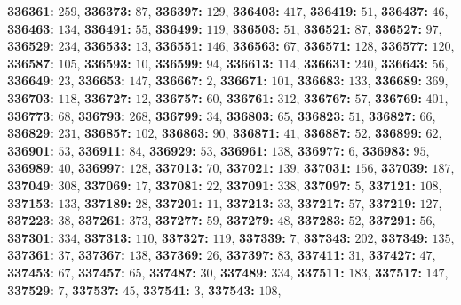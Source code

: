 \textsf{\bfseries 336361:} $259$, \textsf{\bfseries 336373:} $87$, \textsf{\bfseries 336397:} $129$, \textsf{\bfseries 336403:} $417$, \textsf{\bfseries 336419:} $51$, \textsf{\bfseries 336437:} $46$, \textsf{\bfseries 336463:} $134$, \textsf{\bfseries 336491:} $55$, \textsf{\bfseries 336499:} $119$, \textsf{\bfseries 336503:} $51$, \textsf{\bfseries 336521:} $87$, \textsf{\bfseries 336527:} $97$, \textsf{\bfseries 336529:} $234$, \textsf{\bfseries 336533:} $13$, \textsf{\bfseries 336551:} $146$, \textsf{\bfseries 336563:} $67$, \textsf{\bfseries 336571:} $128$, \textsf{\bfseries 336577:} $120$, \textsf{\bfseries 336587:} $105$, \textsf{\bfseries 336593:} $10$, \textsf{\bfseries 336599:} $94$, \textsf{\bfseries 336613:} $114$, \textsf{\bfseries 336631:} $240$, \textsf{\bfseries 336643:} $56$, \textsf{\bfseries 336649:} $23$, \textsf{\bfseries 336653:} $147$, \textsf{\bfseries 336667:} $2$, \textsf{\bfseries 336671:} $101$, \textsf{\bfseries 336683:} $133$, \textsf{\bfseries 336689:} $369$, \textsf{\bfseries 336703:} $118$, \textsf{\bfseries 336727:} $12$, \textsf{\bfseries 336757:} $60$, \textsf{\bfseries 336761:} $312$, \textsf{\bfseries 336767:} $57$, \textsf{\bfseries 336769:} $401$, \textsf{\bfseries 336773:} $68$, \textsf{\bfseries 336793:} $268$, \textsf{\bfseries 336799:} $34$, \textsf{\bfseries 336803:} $65$, \textsf{\bfseries 336823:} $51$, \textsf{\bfseries 336827:} $66$, \textsf{\bfseries 336829:} $231$, \textsf{\bfseries 336857:} $102$, \textsf{\bfseries 336863:} $90$, \textsf{\bfseries 336871:} $41$, \textsf{\bfseries 336887:} $52$, \textsf{\bfseries 336899:} $62$, \textsf{\bfseries 336901:} $53$, \textsf{\bfseries 336911:} $84$, \textsf{\bfseries 336929:} $53$, \textsf{\bfseries 336961:} $138$, \textsf{\bfseries 336977:} $6$, \textsf{\bfseries 336983:} $95$, \textsf{\bfseries 336989:} $40$, \textsf{\bfseries 336997:} $128$, \textsf{\bfseries 337013:} $70$, \textsf{\bfseries 337021:} $139$, \textsf{\bfseries 337031:} $156$, \textsf{\bfseries 337039:} $187$, \textsf{\bfseries 337049:} $308$, \textsf{\bfseries 337069:} $17$, \textsf{\bfseries 337081:} $22$, \textsf{\bfseries 337091:} $338$, \textsf{\bfseries 337097:} $5$, \textsf{\bfseries 337121:} $108$, \textsf{\bfseries 337153:} $133$, \textsf{\bfseries 337189:} $28$, \textsf{\bfseries 337201:} $11$, \textsf{\bfseries 337213:} $33$, \textsf{\bfseries 337217:} $57$, \textsf{\bfseries 337219:} $127$, \textsf{\bfseries 337223:} $38$, \textsf{\bfseries 337261:} $373$, \textsf{\bfseries 337277:} $59$, \textsf{\bfseries 337279:} $48$, \textsf{\bfseries 337283:} $52$, \textsf{\bfseries 337291:} $56$, \textsf{\bfseries 337301:} $334$, \textsf{\bfseries 337313:} $110$, \textsf{\bfseries 337327:} $119$, \textsf{\bfseries 337339:} $7$, \textsf{\bfseries 337343:} $202$, \textsf{\bfseries 337349:} $135$, \textsf{\bfseries 337361:} $37$, \textsf{\bfseries 337367:} $138$, \textsf{\bfseries 337369:} $26$, \textsf{\bfseries 337397:} $83$, \textsf{\bfseries 337411:} $31$, \textsf{\bfseries 337427:} $47$, \textsf{\bfseries 337453:} $67$, \textsf{\bfseries 337457:} $65$, \textsf{\bfseries 337487:} $30$, \textsf{\bfseries 337489:} $334$, \textsf{\bfseries 337511:} $183$, \textsf{\bfseries 337517:} $147$, \textsf{\bfseries 337529:} $7$, \textsf{\bfseries 337537:} $45$, \textsf{\bfseries 337541:} $3$, \textsf{\bfseries 337543:} $108$, 
